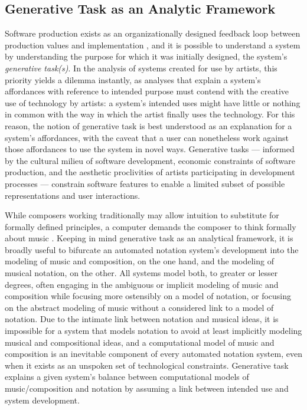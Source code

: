 \documentclass{article}
\begin{document}
\subsection{Generative Task as an Analytic Framework}

Software production exists as an organizationally designed feedback loop
between production values and implementation \cite{Derniame:1999fk}, and it is
possible to understand a system by understanding the purpose for which it was
initially designed, the system's \emph{generative task(s)}. In the analysis of
systems created for use by artists, this priority yields a dilemma instantly,
as analyses that explain a system's affordances with reference to intended
purpose must contend with the creative use of technology by artists: a system's
intended uses might have little or nothing in common with the way in which the
artist finally uses the technology. For this reason, the notion of generative
task is best understood as an explanation for a system's affordances, with the
caveat that a user can nonetheless work against those affordances to use the
system in novel ways. Generative tasks --- informed by the cultural milieu of
software development, economic constraints of software production, and the
aesthetic proclivities of artists participating in development processes ---
constrain software features to enable a limited subset of possible
representations and user interactions.

While composers working traditionally may allow intuition to substitute for
formally defined principles, a computer demands the composer to think formally
about music \cite{Xenakis:1992rq}. Keeping in mind generative task as an
analytical framework, it is broadly useful to bifurcate an automated notation
system's development into the modeling of music and composition, on the one
hand, and the modeling of musical notation, on the other. All systems model
both, to greater or lesser degrees, often engaging in the ambiguous or implicit
modeling of music and composition while focusing more ostensibly on a model of
notation, or focusing on the abstract modeling of music without a considered
link to a model of notation. Due to the intimate link between notation and
musical ideas, it is impossible for a system that models notation to avoid at
least implicitly modeling musical and compositional ideas, and a computational
model of music and composition is an inevitable component of every automated
notation system, even when it exists as an unspoken set of technological
constraints. Generative task explains a given system's balance between
computational models of music/composition and notation by assuming a link
between intended use and system development.
\end{document}
